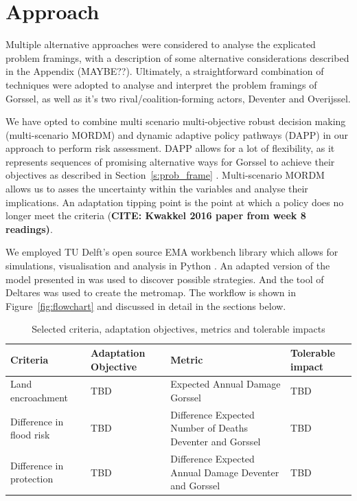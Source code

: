 \section{Approach}
\label{s:oldapproach}

Multiple alternative approaches were considered to analyse the explicated problem framings, with a description of some alternative considerations described in the Appendix (MAYBE??). Ultimately, a straightforward combination of techniques were adopted to analyse and interpret the problem framings of Gorssel, as well as it's two rival/coalition-forming actors, Deventer and Overijssel.

We have opted to combine multi scenario multi-objective robust decision making (multi-scenario MORDM) and dynamic adaptive policy pathways (DAPP) in our approach to perform risk assessment. DAPP allows for a lot of flexibility, as it represents sequences of promising alternative ways for Gorssel to achieve their objectives as described in Section~\ref{s:prob_frame} \citep{Walker2013}. Multi-scenario MORDM allows us to asses the uncertainty within the variables and analyse their implications. An adaptation tipping point is the point at which a policy does no longer meet the criteria (\textbf{CITE: Kwakkel 2016 paper from week 8 readings)}.

We employed TU Delft's open source EMA workbench library which allows for simulations, visualisation and analysis in Python \parencite{kwakkel_exploratory_2017}. An adapted version of the model presented in  was used to discover possible strategies. And the tool of Deltares was used to create the metromap. The workflow is shown in Figure~\ref{fig:flowchart} and discussed in detail in the sections below.

\begin{longtable}[c]{p{2cm}p{2cm}p{5cm}l}
\caption{Selected criteria, adaptation objectives, metrics and tolerable impacts}
\label{tab:criteria}\\
\textbf{Criteria}        & \textbf{Adaptation Objective} & \textbf{Metric}                                           & \textbf{Tolerable impact} \\
\hline
\endfirsthead
%
\endhead
%
Land encroachment & TBD & Expected Annual Damage Gorssel & TBD \\
Difference in flood risk & TBD & Difference Expected Number of Deaths Deventer and Gorssel & TBD\\
Difference in protection & TBD & Difference Expected Annual Damage Deventer and Gorssel & TBD
\end{longtable}



